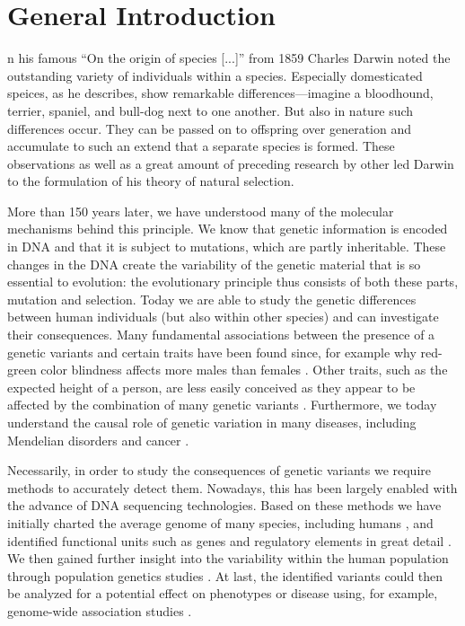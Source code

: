 \chapter{General Introduction}
\label{sec:intro}

n his famous ``On the origin of species [...]'' from 1859 Charles Darwin noted
the outstanding variety of individuals within a species. Especially domesticated
speices, as he describes, show remarkable differences---imagine a bloodhound,
terrier, spaniel, and bull-dog next to one another. But also in nature such
differences occur. They can be passed on to offspring over generation and
accumulate to such an extend that a separate species is formed. These
observations as well as a great amount of preceding research by other led
Darwin to the formulation of his theory of natural selection.

More than 150 years later, we have understood many of the molecular mechanisms
behind this principle. We know that genetic information is encoded in DNA and
that it is subject to mutations, which are partly inheritable. These changes in
the DNA create the variability of the genetic material that is so essential to
evolution: the evolutionary principle thus consists of both these parts,
mutation and selection. Today we are able to study the genetic differences
between human individuals (but also within other species) and can investigate
their consequences. Many fundamental associations between the presence of a
genetic variants and certain traits have been found since, for example why
red-green color blindness affects more males than females \citep{Nathans1986}.
Other traits, such as the expected height of a person, are less easily conceived
as they appear to be affected by the combination of many genetic variants
\citep{Wood2014,Marouli2017}. Furthermore, we today understand the causal role
of genetic variation in many diseases, including Mendelian disorders and cancer
\citep{Stankiewicz2010}.

Necessarily, in order to study the consequences of genetic variants we require
methods to accurately detect them. Nowadays, this has been largely enabled with
the advance of DNA sequencing technologies. Based on these methods we have
initially charted the average genome of many species, including humans
\citep{Lander2001,Venter2001}, and identified functional units such as genes and
regulatory elements in great detail \citep{Dunham2012}. We then gained further
insight into the variability within the human population through population
genetics studies \citep{Auton2015,Sudmant2015}. At last, the identified variants
could then be analyzed for a potential effect on phenotypes or disease using,
for example, genome-wide association studies \citep{Ott2015,MacArthur2017}.

